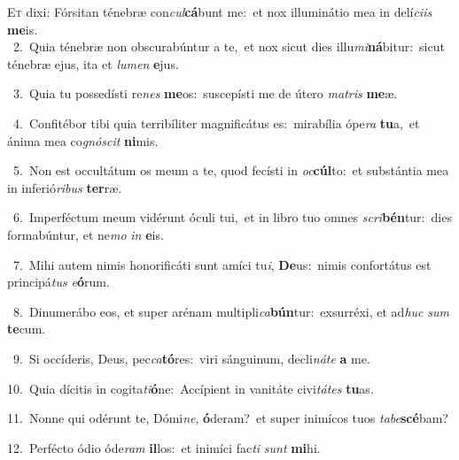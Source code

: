 \lettrine{\initial\textcolor{\initialcolor}{E}}{t} dixi: Fórsitan ténebræ con\-\textit{cul}\-\textbf{cá}bunt me:~\star et nox illuminátio mea in delí\-\textit{ci}\-\textit{is} \textbf{me}\-is.\\
{\numbfont\textcolor{\numbcolor}{~2.}}~Quia ténebræ non obscurabúntur a te,~\dagger et nox sicut dies illu\-\textit{mi}\-\textbf{ná}bitur:~\star sicut ténebræ ejus, ita et \textit{lu}\-\textit{men} \textbf{e}\-jus.\par
{\numbfont\textcolor{\numbcolor}{~3.}}~Quia tu possedísti re\textit{nes} \textbf{me}\-os:~\star suscepísti me de útero \textit{ma}\-\textit{tris} \textbf{me}\-æ.\par
{\numbfont\textcolor{\numbcolor}{~4.}}~Confitébor tibi quia terribíliter magnificátus es:~\dagger mirabília ópe\textit{ra} \textbf{tu}\-a,~\star et ánima mea co\-\textit{gnó}\-\textit{scit} \textbf{ni}\-mis.\par
{\numbfont\textcolor{\numbcolor}{~5.}}~Non est occultátum os meum a te, quod fecísti in \textit{oc}\-\textbf{cúl}to:~\star et substántia mea in inferió\-\textit{ri}\-\textit{bus} \textbf{ter}\-ræ.\par
{\numbfont\textcolor{\numbcolor}{~6.}}~Imperféctum meum vidérunt óculi tui,~\dagger et in libro tuo omnes \textit{scri}\-\textbf{bén}tur:~\star dies formabúntur, et ne\textit{mo} \textit{in} \textbf{e}\-is.\par
{\numbfont\textcolor{\numbcolor}{~7.}}~Mihi autem nimis honorificáti sunt amíci tu\-\textit{i}\-, \textbf{De}\-us:~\star nimis confortátus est principá\textit{tus} \textit{e}\-\textbf{ó}rum.\par
{\numbfont\textcolor{\numbcolor}{~8.}}~Dinumerábo eos, et super arénam multipli\-\textit{ca}\-\textbf{bún}tur:~\star exsurréxi, et ad\textit{huc} \textit{sum} \textbf{te}\-cum.\par
{\numbfont\textcolor{\numbcolor}{~9.}}~Si occíderis, Deus, pec\-\textit{ca}\-\textbf{tó}res:~\star viri sánguinum, decli\-\textit{ná}\-\textit{te} \textbf{a} me.\par
{\numbfont\textcolor{\numbcolor}{10.}}~Quia dícitis in cogita\-\textit{ti}\-\textbf{ó}ne:~\star Accípient in vanitáte civi\-\textit{tá}\-\textit{tes} \textbf{tu}\-as.\par
{\numbfont\textcolor{\numbcolor}{11.}}~Nonne qui odérunt te, Dómi\-\textit{ne}\-, \textbf{ó}\-deram?~\star et super inimícos tuos \textit{ta}\-\textit{be}\textbf{scé}bam?\par
{\numbfont\textcolor{\numbcolor}{12.}}~Perfécto ódio óde\textit{ram} \textbf{il}\-los:~\star et inimíci fac\textit{ti} \textit{sunt} \textbf{mi}\-hi.\par
